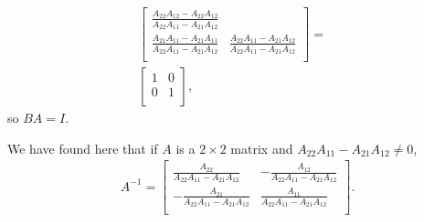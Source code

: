 \documentclass[12pt]{article}
\begin{document}
\begin{enumerate}
\begin{align*}
\begin{bmatrix}
          \frac{A_{22}A_{12} - A_{22}A_{12}}
               {A_{22}A_{11} - A_{21}A_{12}}\\
        \frac{A_{21}A_{11} - A_{21}A_{11}}
             {A_{22}A_{11} - A_{21}A_{12}} &
          \frac{A_{22}A_{11} - A_{21}A_{12}}
               {A_{22}A_{11} - A_{21}A_{12}}\\
      \end{bmatrix}
      =&\\
      \begin{bmatrix}
        1 & 0\\
        0 & 1\\
      \end{bmatrix},
    \end{align*}
    so $BA = I$.

    \begin{comm}
      We have found here that if $A$ is a $2 \times 2$ matrix and
      $A_{22}A_{11} - A_{21}A_{12} \neq 0$,
      \begin{align*}
        A^{-1} =
        \begin{bmatrix}
          \frac{A_{22}}{A_{22}A_{11} - A_{21}A_{12}} &
            -\frac{A_{12}}{A_{22}A_{11} - A_{21}A_{12}}\\
          -\frac{A_{21}}{A_{22}A_{11} - A_{21}A_{12}} &
            \frac{A_{11}}{A_{22}A_{11} - A_{21}A_{12}}\\
        \end{bmatrix}.
      \end{align*}
    \end{comm}
\end{enumerate}
\end{document}
